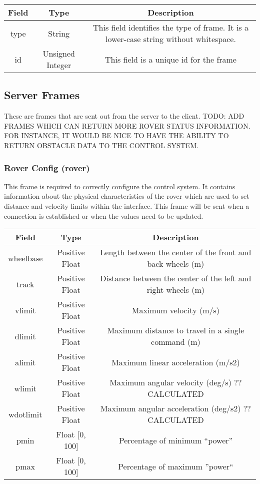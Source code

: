 \documentclass[letterpaper,10pt]{article}
\begin{document}
    \begin{tabular}{ccc}
      \textbf{Field} & \textbf{Type} & \textbf{Description}\\\hline
      type & String & This field identifies the type of frame.  It is a lower-case string without whitespace.\\
      id & Unsigned Integer & This field is a unique id for the frame\\
    \end{tabular}

  \subsection{Server Frames}
    These are frames that are sent out from the server to the client.  TODO: ADD FRAMES WHICH CAN RETURN MORE ROVER STATUS INFORMATION.  FOR INSTANCE, IT WOULD BE NICE TO HAVE THE ABILITY TO RETURN OBSTACLE DATA TO THE CONTROL SYSTEM.
    
    \subsubsection{Rover Config (rover)}
      This frame is required to correctly configure the control system.  It contains information about the physical characteristics of the rover which are used to set distance and velocity limits within the interface.  This frame will be sent when a connection is established or when the values need to be updated.
      
      \begin{tabular}{ccc}
	\textbf{Field} & \textbf{Type} & \textbf{Description}\\\hline
	wheelbase & Positive Float & Length between the center of the front and back wheels (m)\\
	track & Positive Float & Distance between the center of the left and right wheels (m)\\
	vlimit & Positive Float & Maximum velocity (m/s)\\
	dlimit & Positive Float & Maximum distance to travel in a single command (m)\\
	alimit & Positive Float & Maximum linear acceleration (m/s2)\\
	wlimit & Positive Float & Maximum angular velocity (deg/s) ?? CALCULATED\\	
	wdotlimit & Positive Float & Maximum angular acceleration (deg/s2) ?? CALCULATED\\
	pmin & Float [0, 100] & Percentage of minimum ``power''\\
	pmax & Float [0, 100] & Percentage of maximum ''power``\\
      \end{tabular}
\end{document}
